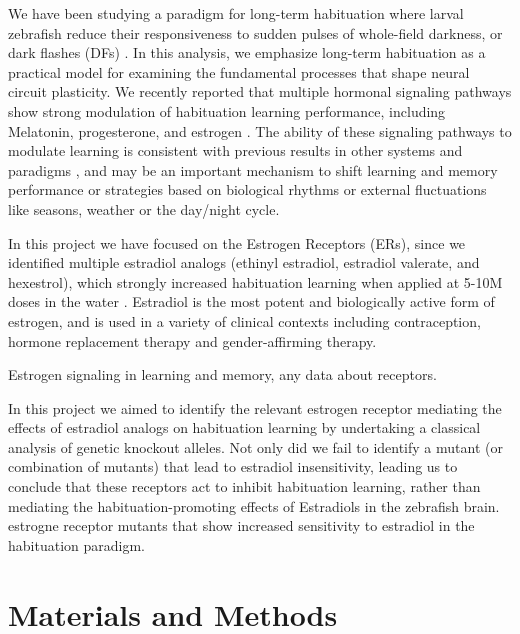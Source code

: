 \documentclass[9pt,lineno]{RandlettLab_elife}
\begin{document}
We have been studying a paradigm for long-term habituation where larval zebrafish reduce their responsiveness to sudden pulses of whole-field darkness, or dark flashes (DFs) \citep{wolman_chemical_2011, Randlett2019-fj, Lamire2023-he}. 
In this analysis, we emphasize long-term habituation as a practical model for examining the fundamental processes that shape neural circuit plasticity.
We recently reported that multiple hormonal signaling pathways show strong modulation of habituation learning performance, including Melatonin, progesterone, and estrogen \citep{Lamire2023-he}. 
The ability of these signaling pathways to modulate learning is consistent with previous results in other systems and paradigms \citep{Nilsson2002-as, Naderi2020-ot, Dillon2013-rk, Rawashdeh2007-bw, Jilg2019-oy, El-Sherif2003-vt, Barros2015-jm}, and may be an important mechanism to shift learning and memory performance or strategies based on biological rhythms or external fluctuations like seasons, weather or the day/night cycle.

In this project we have focused on the Estrogen Receptors (ERs), since we identified multiple estradiol analogs (ethinyl estradiol, estradiol valerate, and hexestrol), which strongly increased habituation learning when applied at 5-10\textmu M doses in the water \citep{Lamire2023-he}.
Estradiol is the most potent and biologically active form of estrogen, and is used in a variety of clinical contexts including contraception, hormone replacement therapy and gender-affirming therapy.  



Estrogen signaling in learning and memory, any data about receptors. 

In this project we aimed to identify the relevant estrogen receptor mediating the effects of estradiol analogs on habituation learning by undertaking a classical analysis of genetic knockout alleles. 
Not only did we fail to identify a mutant (or combination of mutants) that lead to estradiol insensitivity, leading us to conclude that these receptors act to inhibit habituation learning, rather than mediating the habituation-promoting effects of Estradiols in the zebrafish brain. 
estrogne receptor mutants that show increased sensitivity to estradiol in the habituation paradigm. 


\section{Materials and Methods}
\end{document}
